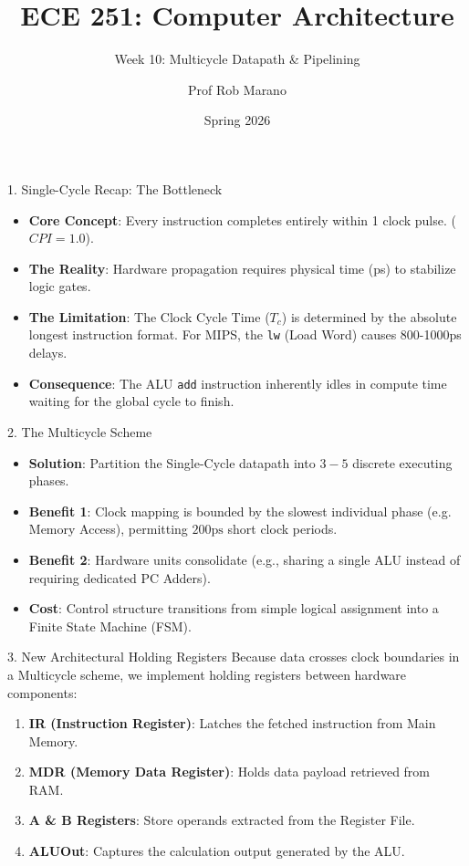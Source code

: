 \documentclass[aspectratio=169]{beamer}
\title{ECE 251: Computer Architecture}
\subtitle{Week 10: Multicycle Datapath \& Pipelining}
\author{Prof Rob Marano}
\date{Spring 2026}
\begin{document}
\begin{frame}
\titlepage
\end{frame}

\begin{frame}{1. Single-Cycle Recap: The Bottleneck}
\begin{itemize}
    \item \textbf{Core Concept}: Every instruction completes entirely within 1 clock pulse. ($CPI = 1.0$).
    \item \textbf{The Reality}: Hardware propagation requires physical time (ps) to stabilize logic gates.
    \item \textbf{The Limitation}: The Clock Cycle Time ($T_c$) is determined by the absolute longest instruction format. For MIPS, the \texttt{lw} (Load Word) causes 800-1000ps delays.
    \item \textbf{Consequence}: The ALU \texttt{add} instruction inherently idles in compute time waiting for the global cycle to finish.
\end{itemize}
\end{frame}

\begin{frame}{2. The Multicycle Scheme}
\begin{itemize}
    \item \textbf{Solution}: Partition the Single-Cycle datapath into $3-5$ discrete executing phases.
    \item \textbf{Benefit 1}: Clock mapping is bounded by the slowest individual phase (e.g. Memory Access), permitting $200\text{ps}$ short clock periods.
    \item \textbf{Benefit 2}: Hardware units consolidate (e.g., sharing a single ALU instead of requiring dedicated PC Adders).
    \item \textbf{Cost}: Control structure transitions from simple logical assignment into a Finite State Machine (FSM).
\end{itemize}
\end{frame}

\begin{frame}{3. New Architectural Holding Registers}
Because data crosses clock boundaries in a Multicycle scheme, we implement holding registers between hardware components:
\vspace{0.2cm}
\begin{enumerate}
    \item \textbf{IR (Instruction Register)}: Latches the fetched instruction from Main Memory.
    \item \textbf{MDR (Memory Data Register)}: Holds data payload retrieved from RAM.
    \item \textbf{A \& B Registers}: Store operands extracted from the Register File.
    \item \textbf{ALUOut}: Captures the calculation output generated by the ALU.
\end{enumerate}
\end{frame}
\end{document}
